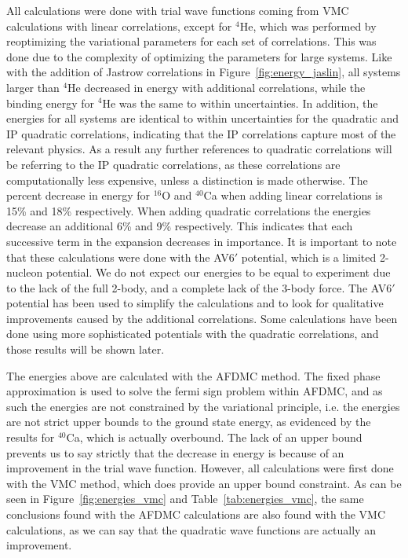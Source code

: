 All calculations were done with trial wave functions coming from VMC calculations with linear correlations, except for $^4$He, which was performed by reoptimizing the variational parameters for each set of correlations. This was done due to the complexity of optimizing the parameters for large systems. Like with the addition of Jastrow correlations in Figure~\ref{fig:energy_jaslin}, all systems larger than $^4$He decreased in energy with additional correlations, while the binding energy for $^4$He was the same to within uncertainties. In addition, the energies for all systems are identical to within uncertainties for the quadratic and IP quadratic correlations, indicating that the IP correlations capture most of the relevant physics. As a result any further references to quadratic correlations will be referring to the IP quadratic correlations, as these correlations are computationally less expensive, unless a distinction is made otherwise. The percent decrease in energy for $^{16}$O and $^{40}$Ca when adding linear correlations is 15\% and 18\% respectively. When adding quadratic correlations the energies decrease an additional 6\% and 9\% respectively. This indicates that each successive term in the expansion decreases in importance. It is important to note that these calculations were done with the AV6$'$ potential, which is a limited 2-nucleon potential. We do not expect our energies to be equal to experiment due to the lack of the full 2-body, and a complete lack of the 3-body force. The AV6$'$ potential has been used to simplify the calculations and to look for qualitative improvements caused by the additional correlations. Some calculations have been done using more sophisticated potentials with the quadratic correlations, and those results will be shown later.

The energies above are calculated with the AFDMC method. The fixed phase approximation is used to solve the fermi sign problem within AFDMC, and as such the energies are not constrained by the variational principle, i.e. the energies are not strict upper bounds to the ground state energy, as evidenced by the results for $^{40}$Ca, which is actually overbound. The lack of an upper bound prevents us to say strictly that the decrease in energy is because of an improvement in the trial wave function. However, all calculations were first done with the VMC method, which does provide an upper bound constraint. As can be seen in Figure~\ref{fig:energies_vmc} and Table~\ref{tab:energies_vmc}, the same conclusions found with the AFDMC calculations are also found with the VMC calculations, as we can say that the quadratic wave functions are actually an improvement.

